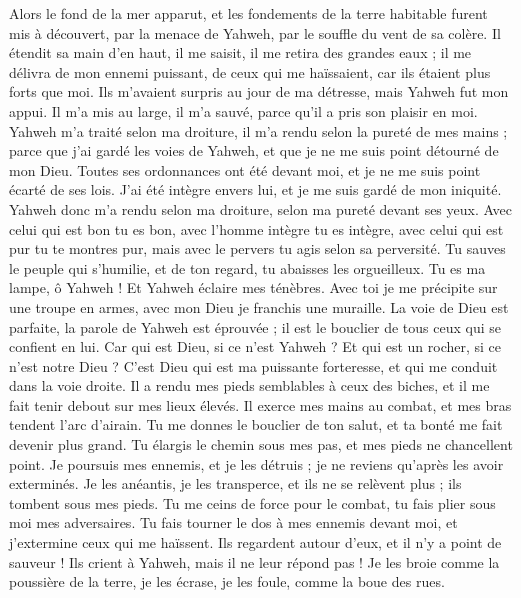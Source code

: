 \begin{multicols}{2}
Alors le fond de la mer apparut, et les fondements de la terre habitable furent mis à découvert, par la menace de Yahweh, par le souffle du vent de sa colère.
Il étendit sa main d'en haut, il me saisit, il me retira des grandes eaux ;
il me délivra de mon ennemi puissant, de ceux qui me haïssaient, car ils étaient plus forts que moi.
Ils m'avaient surpris au jour de ma détresse, mais Yahweh fut mon appui.
Il m'a mis au large, il m'a sauvé, parce qu'il a pris son plaisir en moi.
Yahweh m'a traité selon ma droiture, il m'a rendu selon la pureté de mes mains ;
parce que j'ai gardé les voies de Yahweh, et que je ne me suis point détourné de mon Dieu.
Toutes ses ordonnances ont été devant moi, et je ne me suis point écarté de ses lois.
J'ai été intègre envers lui, et je me suis gardé de mon iniquité.
Yahweh donc m'a rendu selon ma droiture, selon ma pureté devant ses yeux.
Avec celui qui est bon tu es bon, avec l'homme intègre tu es intègre,
avec celui qui est pur tu te montres pur, mais avec le pervers tu agis selon sa perversité.
Tu sauves le peuple qui s'humilie, et de ton regard, tu abaisses les orgueilleux.
Tu es ma lampe, ô Yahweh ! Et Yahweh éclaire mes ténèbres.
Avec toi je me précipite sur une troupe en armes, avec mon Dieu je franchis une muraille.
La voie de Dieu est parfaite, la parole de Yahweh est éprouvée ; il est le bouclier de tous ceux qui se confient en lui.
Car qui est Dieu, si ce n'est Yahweh ? Et qui est un rocher, si ce n'est notre Dieu ?
C'est Dieu qui est ma puissante forteresse, et qui me conduit dans la voie droite.
Il a rendu mes pieds semblables à ceux des biches, et il me fait tenir debout sur mes lieux élevés.
Il exerce mes mains au combat, et mes bras tendent l'arc d'airain.
Tu me donnes le bouclier de ton salut, et ta bonté me fait devenir plus grand.
Tu élargis le chemin sous mes pas, et mes pieds ne chancellent point.
Je poursuis mes ennemis, et je les détruis ; je ne reviens qu'après les avoir exterminés.
Je les anéantis, je les transperce, et ils ne se relèvent plus ; ils tombent sous mes pieds.
Tu me ceins de force pour le combat, tu fais plier sous moi mes adversaires.
Tu fais tourner le dos à mes ennemis devant moi, et j'extermine ceux qui me haïssent.
Ils regardent autour d'eux, et il n'y a point de sauveur ! Ils crient à Yahweh, mais il ne leur répond pas !
Je les broie comme la poussière de la terre, je les écrase, je les foule, comme la boue des rues.

\end{multicols}
